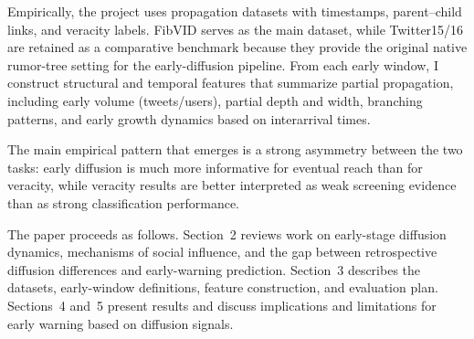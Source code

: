 Empirically, the project uses propagation datasets with timestamps, parent--child links, and veracity labels. FibVID serves as the main dataset, while Twitter15/16 are retained as a comparative benchmark because they provide the original native rumor-tree setting for the early-diffusion pipeline. From each early window, I construct structural and temporal features that summarize partial propagation, including early volume (tweets/users), partial depth and width, branching patterns, and early growth dynamics based on interarrival times.

The main empirical pattern that emerges is a strong asymmetry between the two tasks: early diffusion is much more informative for eventual reach than for veracity, while veracity results are better interpreted as weak screening evidence than as strong classification performance.

The paper proceeds as follows. Section~2 reviews work on early-stage diffusion dynamics, mechanisms of social influence, and the gap between retrospective diffusion differences and early-warning prediction. Section~3 describes the datasets, early-window definitions, feature construction, and evaluation plan. Sections~4 and~5 present results and discuss implications and limitations for early warning based on diffusion signals.
